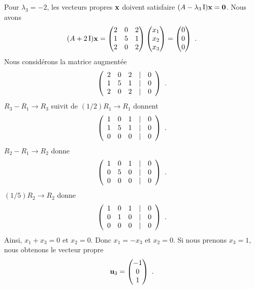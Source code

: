 {Pour $\lambda_3 = -2$, les vecteurs propres $\mathbf{x}$ doivent
satisfaire $(A-\lambda_3\operatorname{I})\mathbf{x} = \mathbf{0}$.  Nous avons
\[
(A+2 \operatorname{I})\mathbf{x} =
\begin{pmatrix} 2 & 0 & 2 \\1 & 5 & 1 \\2 & 0 & 2 \end{pmatrix}
\begin{pmatrix} x_1 \\ x_2 \\ x_3 \end{pmatrix}
= \begin{pmatrix} 0 \\ 0 \\ 0 \end{pmatrix} \ .
\]
Nous considérons la matrice augmentée
\[
\left(\begin{array}{ccc@{\quad | \quad}c}
2 & 0 & 2 & 0 \\1 & 5 & 1 & 0 \\2 & 0 & 2 & 0
\end{array}\right) \ .
\]
$R_3-R_1\rightarrow R_3$ suivit de $(1/2)R_1\rightarrow R_1$ donnent
\[
\left(\begin{array}{ccc@{\quad | \quad}c}
1 & 0 & 1 & 0 \\1 & 5 & 1 & 0 \\0 & 0 & 0 & 0
\end{array}\right) \ .
\]
$R_2-R_1 \rightarrow R_2$ donne
\[
\left(\begin{array}{ccc@{\quad | \quad}c}
1 & 0 & 1 & 0 \\0 & 5 & 0 & 0 \\0 & 0 & 0 & 0
\end{array}\right) \ .
\]
$(1/5)R_2\rightarrow R_2$ donne
\[
\left(\begin{array}{ccc@{\quad | \quad}c}
1 & 0 & 1 & 0 \\0 & 1 & 0 & 0 \\0 & 0 & 0 & 0
\end{array}\right) \ .
\]
Ainsi, $x_1+x_3=0$ et $x_2=0$.  Donc $x_1=-x_3$ et $x_2=0$.  Si
nous prenons $x_3=1$, nous obtenons le vecteur propre
\[
\mathbf{u}_3 = \begin{pmatrix} -1 \\ 0 \\ 1 \end{pmatrix} \ .
\]

}
